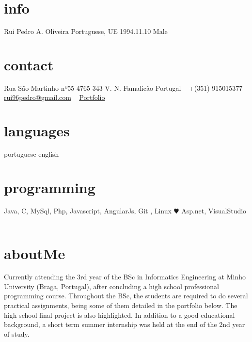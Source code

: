 \documentclass[]{friggeri-cv} %
\begin{document}


\begin{aside} %
\section{info}
Rui Pedro A. Oliveira
Portuguese, UE
1994.11.10
Male
\section{contact}
Rua São Martinho nº55
4765-343 V. N. Famalicão
Portugal
~
+(351) 915015377
~
\href{mailto:rui96pedro@gmail.com}{rui96pedro@gmail.com}
~
\href{https://bitbucket.org/ruiOliveiras94}{Portfolio}
~
\section{languages}
portuguese
english 
\section{programming}
Java, C, MySql,
Php, Javascript, AngularJs,
Git , Linux {\color{red} $\varheartsuit$} 
Asp.net, VisualStudio
~
\end{aside}

\section{aboutMe}
Currently attending the 3rd year of the BSc in Informatics Engineering at Minho University (Braga, Portugal), after concluding a high school professional programming course. Throughout the BSc, the students are required to do several practical assignments, being some of them detailed in the portfolio below. The high school final project is also highlighted. In addition to a good educational background, a short term summer internship was held at the end of the 2nd year of study.

\end{document}
